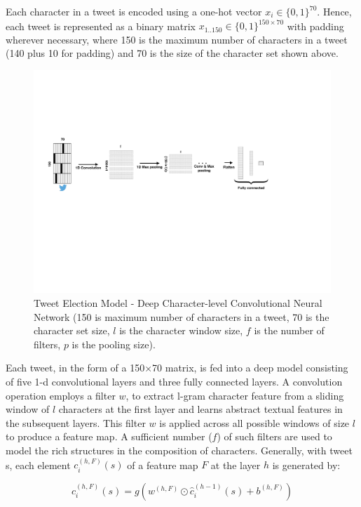 \documentclass[letterpaper]{article}
\begin{document}
Each character in a tweet is encoded using a one-hot vector $x_i\in\{0,1\}^{70}$. Hence, each tweet is represented as a binary matrix $x_{1..150}\in\{0,1\}^{150\times70}$ with padding wherever necessary, where 150 is the maximum number of characters in a tweet (140 plus 10 for padding) and 70 is the size of the character set shown above.
\begin{figure}[]
\includegraphics[width=\columnwidth]{cnn_char.pdf} %
\caption{Tweet Election Model -  Deep Character-level Convolutional Neural Network (150 is maximum number of characters in a tweet, 70 is the character set size, $l$ is the character window size,  $f$ is the number of filters, $p$ is the pooling size).}
\label{cnn_elect}
\end{figure}
Each tweet, in the form of a 150$\times$70 matrix, is fed into a deep model consisting of five 1-d convolutional layers and three fully connected layers. A convolution operation employs a filter $w$, to extract l-gram character feature from a sliding window of $l$ characters at the first layer and learns abstract textual features in the subsequent layers. This filter $w$ is applied across all possible windows of size $l$ to produce a feature map. A sufficient number ($f$) of such filters are used to model the rich structures in the composition of characters. Generally, with tweet s, each element $c_i^{(h,F)}(s)$ of a feature map $F$ at the layer $h$ is generated by:

\begin{equation}\label{conv}c_i^{(h,F)}(s)=g(w^{(h,F)}\odot \hat{c}_i^{(h-1)}(s)+b^{(h,F)})
\end{equation}
\end{document}
